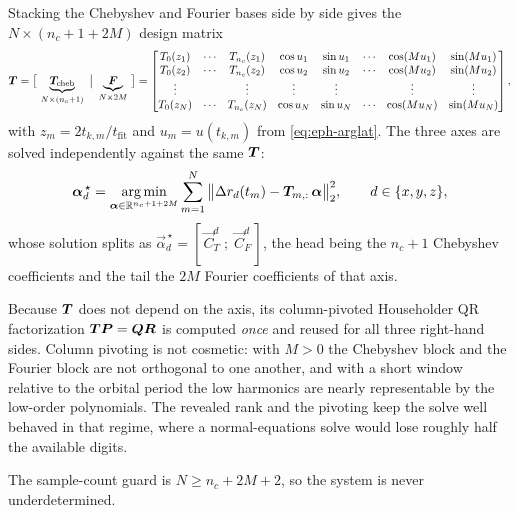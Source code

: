 Stacking the Chebyshev and Fourier bases side by side gives the
$N\times(n_c+1+2M)$ design matrix
\begin{equation}
  \label{eq:eph-design}
  \bm{T} =
  \big[\,\underbrace{\bm{T}_\mathrm{cheb}}_{N\times(n_c+1)}\ \big|\
        \underbrace{\bm{F}}_{N\times 2M}\,\big]
  =
  \begin{bmatrix}
    T_0(z_1) & \cdots & T_{n_c}(z_1) & \cos u_1 & \sin u_1 & \cdots & \cos(Mu_1) & \sin(Mu_1)\\
    T_0(z_2) & \cdots & T_{n_c}(z_2) & \cos u_2 & \sin u_2 & \cdots & \cos(Mu_2) & \sin(Mu_2)\\
    \vdots   &        & \vdots       & \vdots   & \vdots   &        & \vdots     & \vdots \\
    T_0(z_N) & \cdots & T_{n_c}(z_N) & \cos u_N & \sin u_N & \cdots & \cos(Mu_N) & \sin(Mu_N)
  \end{bmatrix},
\end{equation}
with $z_m = 2t_{k,m}/t_\mathrm{fit}$ and $u_m = u(t_{k,m})$ from
\cref{eq:eph-arglat}. The three axes are solved independently against the same
$\bm{T}$:
\begin{equation}
  \label{eq:eph-ls}
  \bm{\alpha}_d^{\,\star}
  = \operatorname*{arg\,min}_{\bm{\alpha}\in\mathbb{R}^{n_c+1+2M}}
    \sum_{m=1}^{N}\big\lVert \Delta r_d(t_m) - \bm{T}_{m,:}\,\bm{\alpha} \big\rVert_2^2,
  \qquad d \in \{x, y, z\},
\end{equation}
whose solution splits as
$\vec{\alpha}_d^{\,\star} = [\,\vec{C}^{d}_{T}\;;\;\vec{C}^{d}_{F}\,]$, the
head being the $n_c+1$ Chebyshev coefficients and the tail the $2M$ Fourier
coefficients of that axis.

Because $\bm{T}$ does not depend on the axis, its column-pivoted Householder
QR factorization $\bm{T}\bm{P} = \bm{Q}\bm{R}$ is computed \emph{once} and
reused for all three right-hand sides. Column pivoting is not cosmetic: with
$M > 0$ the Chebyshev block and the Fourier block are not orthogonal to one
another, and with a short window relative to the orbital period the low
harmonics are nearly representable by the low-order polynomials. The revealed
rank and the pivoting keep the solve well behaved in that regime, where a
normal-equations solve would lose roughly half the available digits.

The sample-count guard is $N \ge n_c + 2M + 2$, so the system is never
underdetermined.

